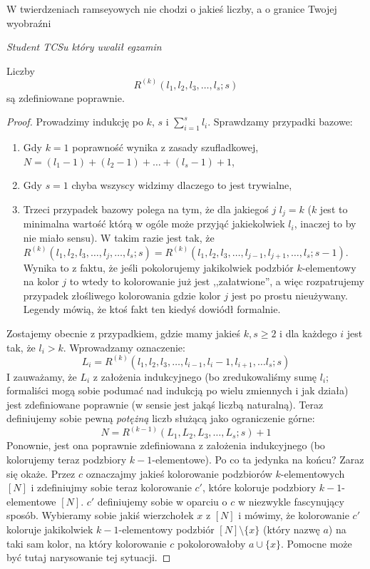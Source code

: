  \epigraph{W twierdzeniach ramseyowych nie chodzi o jakieś liczby, a o granice Twojej wyobraźni}{\textit{Student TCSu który uwalił egzamin}}
    \begin{theorem}
            Liczby
    \begin{equation*}
         R^{(k)}(l_1,l_2,l_3,\dots,l_s;s)
    \end{equation*}
    są zdefiniowane poprawnie. 
    \end{theorem}

    \begin{proof}
        Prowadzimy indukcję po $k$, $s$ i $\sum_{i=1}^{s} l_i$. Sprawdzamy przypadki bazowe:
        \begin{enumerate}
            \item Gdy $k = 1$ poprawność wynika z zasady szufladkowej, $N = (l_1 - 1) + (l_2 - 1) + \dots + (l_s - 1) + 1$,
            \item Gdy $s = 1$ chyba wszyscy widzimy dlaczego to jest trywialne,
            \item Trzeci przypadek bazowy polega na tym, że dla jakiegoś $j$ $l_j = k$ ($k$ jest to minimalna wartość którą w ogóle może przyjąć jakiekolwiek $l_i$, inaczej to by nie miało sensu). W takim razie jest tak, że $R^{(k)}(l_1,l_2,l_3,\dots,l_j,\dots,l_s;s) = R^{(k)}(l_1,l_2,l_3,\dots,l_{j-1}, l_{j+1}, \dots,l_s;s-1)$. Wynika to z faktu, że jeśli pokolorujemy jakikolwiek podzbiór $k$-elementowy na kolor $j$ to wtedy to kolorowanie już jest ,,załatwione'', a więc rozpatrujemy przypadek złośliwego kolorowania gdzie kolor $j$ jest po prostu nieużywany. Legendy mówią, że ktoś fakt ten kiedyś dowiódł formalnie.
        \end{enumerate}

        Zostajemy obecnie z przypadkiem, gdzie mamy jakieś $k, s \geq 2$ i dla każdego $i$ jest tak, że $l_i > k$. Wprowadzamy oznaczenie:
        \begin{equation*}
            L_i = R^{(k)}(l_1,l_2,l_3,\dots, l_{i-1}, l_i - 1, l_{i+1}, \dots l_s;s)
        \end{equation*}
        I zauważamy, że $L_i$ z założenia indukcyjnego (bo zredukowaliśmy sumę $l_i$; formaliści mogą sobie podumać nad indukcją po wielu zmiennych i jak działa) jest zdefiniowane poprawnie (w sensie jest jakąś liczbą naturalną). Teraz definiujemy sobie pewną \textit{potężną} liczb służącą jako ograniczenie górne:
        \begin{equation*}
            N = R^{(k-1)}(L_1, L_2, L_3, \dots, L_s; s) + 1
        \end{equation*}
        Ponownie, jest ona poprawnie zdefiniowana z założenia indukcyjnego (bo kolorujemy teraz podzbiory $k-1$-elementowe). Po co ta jedynka na końcu? Zaraz się okaże. Przez $c$ oznaczajmy jakieś kolorowanie podzbiorów $k$-elementowych $[N]$ i zdefiniujmy sobie teraz kolorowanie $c'$, które koloruje podzbiory $k-1$-elementowe $[N]$. $c'$ definiujemy sobie w oparciu o $c$ w niezwykle fascynujący sposób. Wybieramy sobie jakiś wierzchołek $x$ z $[N]$ i mówimy, że kolorowanie $c'$ koloruje jakikolwiek $k-1$-elementowy podzbiór $[N] \setminus \{x\}$ (który nazwę $a$) na taki sam kolor, na który kolorowanie $c$ pokolorowałoby $a \cup \{x\}$. Pomocne może być tutaj narysowanie tej sytuacji.


\end{proof}
